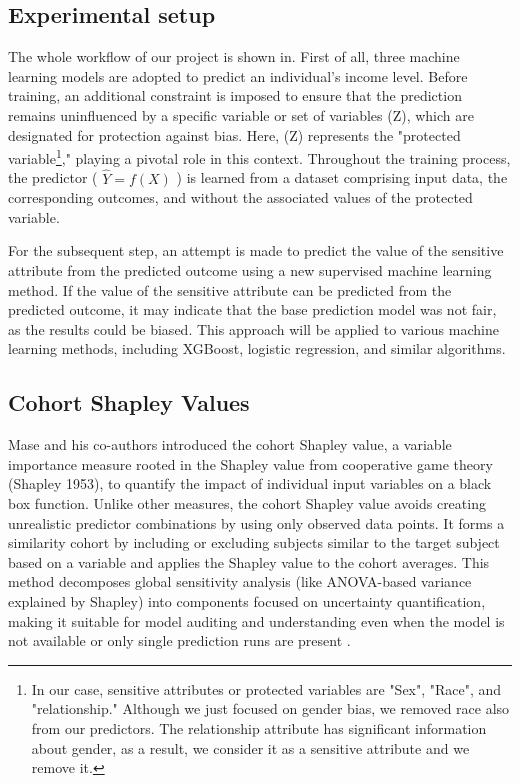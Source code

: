 \documentclass[conference]{IEEEtran}
\begin{document}
\subsection{Experimental setup}
The whole workflow of our project is shown in. First of all, three machine learning models are adopted to predict an individual's income level. Before training, an additional constraint is imposed to ensure that the prediction remains uninfluenced by a specific variable or set of variables (Z), which are designated for protection against bias. Here, (Z) represents the "protected variable\footnote{In our case, sensitive attributes or protected variables are "Sex", "Race", and "relationship." Although we just focused on gender bias, we removed race also from our predictors. The relationship attribute has significant information about gender, as a result, we consider it as a sensitive attribute and we remove it.}," playing a pivotal role in this context. Throughout the training process, the predictor ( $\hat{Y} = f(X)$ ) is learned from a dataset comprising input data, the corresponding outcomes, and without the associated values of the protected variable.

For the subsequent step, an attempt is made to predict the value of the sensitive attribute from the predicted outcome using a new supervised machine learning method. If the value of the sensitive attribute can be predicted from the predicted outcome, it may indicate that the base prediction model was not fair, as the results could be biased. This approach will be applied to various machine learning methods, including XGBoost, logistic regression, and similar algorithms.

\subsection{Cohort Shapley Values}

Mase and his co-authors introduced the cohort Shapley value, a variable importance measure rooted in the Shapley value from cooperative game theory (Shapley 1953), to quantify the impact of individual input variables on a black box function. Unlike other measures, the cohort Shapley value avoids creating unrealistic predictor combinations by using only observed data points. It forms a similarity cohort by including or excluding subjects similar to the target subject based on a variable and applies the Shapley value to the cohort averages. This method decomposes global sensitivity analysis (like ANOVA-based variance explained by Shapley) into components focused on uncertainty quantification, making it suitable for model auditing and understanding even when the model is not available or only single prediction runs are present \cite{mase2019explaining}.
\end{document}
